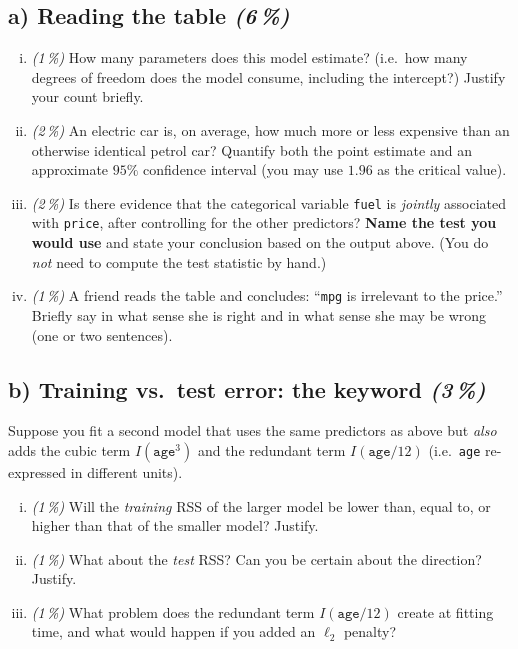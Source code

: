 \documentclass[11pt,a4paper]{article}
\newcommand{\subpoints}[1]{\textit{(#1\,\%)}}
\begin{document}
\subsection*{a) Reading the table \subpoints{6}}
\begin{enumerate}[(i)]
  \item \subpoints{1} How many parameters does this model estimate? (i.e.\ how many degrees of freedom does the model consume, including the intercept?) Justify your count briefly.
  \item \subpoints{2} An electric car is, on average, how much more or less expensive than an otherwise identical petrol car? Quantify both the point estimate and an approximate $95\%$ confidence interval (you may use $1.96$ as the critical value).
  \item \subpoints{2} Is there evidence that the categorical variable \texttt{fuel} is \emph{jointly} associated with \texttt{price}, after controlling for the other predictors? \textbf{Name the test you would use} and state your conclusion based on the output above. (You do \emph{not} need to compute the test statistic by hand.)
  \item \subpoints{1} A friend reads the table and concludes: ``\texttt{mpg} is irrelevant to the price.'' Briefly say in what sense she is right and in what sense she may be wrong (one or two sentences).
\end{enumerate}

\subsection*{b) Training vs.\ test error: the keyword \subpoints{3}}
Suppose you fit a second model that uses the same predictors as above but \emph{also} adds the cubic term $I(\texttt{age}^3)$ and the redundant term $I(\texttt{age}/12)$ (i.e.\ \texttt{age} re-expressed in different units).

\begin{enumerate}[(i)]
  \item \subpoints{1} Will the \emph{training} RSS of the larger model be lower than, equal to, or higher than that of the smaller model? Justify.
  \item \subpoints{1} What about the \emph{test} RSS? Can you be certain about the direction? Justify.
  \item \subpoints{1} What problem does the redundant term $I(\texttt{age}/12)$ create at fitting time, and what would happen if you added an $\ell_2$ penalty?
\end{enumerate}
\end{document}
